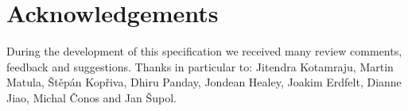 \section{Acknowledgements}
\label{acks}

During the development of this specification we received many review comments, feedback and suggestions. Thanks in particular to: Jitendra Kotamraju, Martin Matula, \v{S}t\v{e}p\'an Kop\v{r}iva, Dhiru Panday, Jondean Healey, Joakim Erdfelt, Dianne Jiao, Michal \v{C}onos and Jan \v{S}upol.

